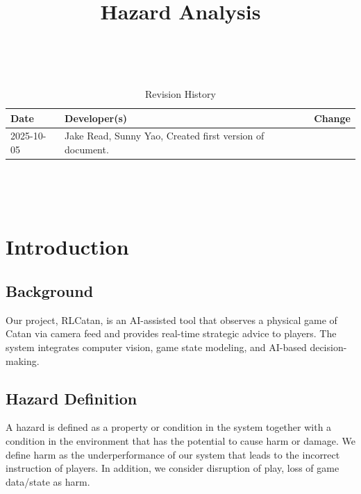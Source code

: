 \documentclass{article}
\title{Hazard Analysis\\\progname}
\author{\authname}
\date{}
\begin{document}
\maketitle
\thispagestyle{empty}

~\newpage


\begin{table}[hp]
\caption{Revision History} \label{TblRevisionHistory}
\begin{tabularx}{\textwidth}{llX}
\toprule
\textbf{Date} & \textbf{Developer(s)} & \textbf{Change}\\
\midrule
2025-10-05 & Jake Read, Sunny Yao, Created first version of document.\\

\bottomrule
\end{tabularx}
\end{table}

~\newpage

\tableofcontents
\listoftables
\listoffigures

~\newpage



\section{Introduction}\label{sec:introduction}


\subsection{Background}\label{subsec:background}
Our project, RLCatan, is an AI-assisted tool that observes a physical game of Catan via camera feed and provides real-time strategic advice to players.
The system integrates computer vision, game state modeling, and AI-based decision-making.

\subsection{Hazard Definition}\label{subsec:hazard-definition}
A hazard is defined as a property or condition in the system together
with a condition in the environment that has the potential to cause harm or
damage. We define harm as the underperformance of our system
that leads to the incorrect instruction of players. In addition, we consider
disruption of play, loss of game data/state as harm.
\end{document}
